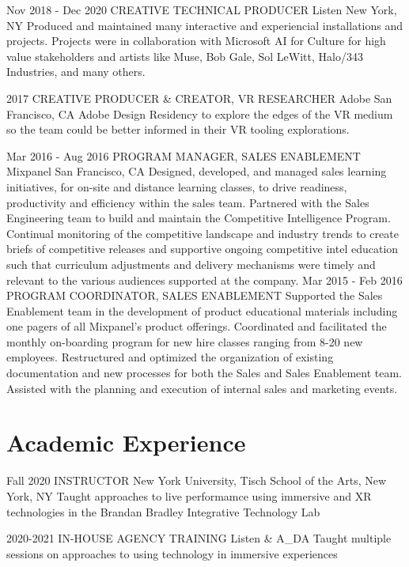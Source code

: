 \documentclass[11pt,a4paper,sans]{moderncv}   %
\begin{document}
\cventry
  {Nov 2018 - Dec 2020}
  {CREATIVE TECHNICAL PRODUCER}
  {Listen}
  {New York, NY}{}
  {Produced and maintained many interactive and experiencial installations and projects. Projects were in collaboration with Microsoft AI for Culture for high value stakeholders and artists like Muse, Bob Gale, Sol LeWitt, Halo/343 Industries, and many others.}

\cventry
  {2017}
  {CREATIVE PRODUCER \& CREATOR, VR RESEARCHER}
  {Adobe}
  {San Francisco, CA}{}
  {Adobe Design Residency to explore the edges of the VR medium so the team could be better informed in their VR tooling explorations.}

  \cventry
  {Mar 2016 - Aug 2016}
  {PROGRAM MANAGER, SALES ENABLEMENT}
  {Mixpanel}
  {San Francisco, CA}{}
  {Designed, developed, and managed sales learning initiatives, for on-site and distance learning classes, to drive readiness, productivity and efficiency within the sales team. 
  Partnered with the Sales Engineering team to build and maintain the Competitive Intelligence Program. Continual monitoring of the competitive landscape and industry trends to create briefs of competitive releases and supportive ongoing competitive intel education such that curriculum adjustments and delivery mechanisms were timely and relevant to the various audiences supported at the company.}
\cventry
  {Mar 2015 - Feb 2016}
  {PROGRAM COORDINATOR, SALES ENABLEMENT}
  {}
  {}{}
  {Supported the Sales Enablement team in the development of product educational materials including one pagers of all Mixpanel's product offerings. 
  Coordinated and facilitated the monthly on-boarding program for new hire classes ranging from 8-20 new employees. Restructured and optimized the organization of existing documentation and new processes for both the Sales and Sales Enablement team. 
  Assisted with the planning and execution of internal sales and marketing events.}


\section{Academic Experience}
\cventry
  {Fall 2020}
  {INSTRUCTOR}
  {New York University, Tisch School of the Arts, 
  New York, NY}{}
  {}{}{}
  {Taught approaches to live performamce using immersive and XR technologies in the Brandan Bradley Integrative Technology Lab}

\cventry
  {2020-2021}
  {IN-HOUSE AGENCY TRAINING}
  {Listen \& A\_DA}{}
  {}{}{}
  {Taught multiple sessions on approaches to using technology in immersive experiences}
\end{document}

